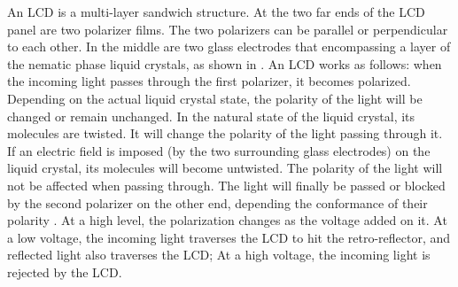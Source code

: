 An LCD is a multi-layer sandwich structure. At the two far ends of the LCD panel are two polarizer films. The two polarizers can be parallel or perpendicular to each other. In the middle are two glass electrodes that encompassing a layer of the nematic phase liquid crystals, as shown in . 
An LCD works as follows: when the incoming light passes through the first polarizer, it becomes polarized. Depending on the actual liquid crystal state, the polarity of the light will be changed or remain unchanged. 
In the natural state of the liquid crystal, its molecules are twisted. It will change the polarity of the light passing through it. If an electric field is imposed (by the two surrounding glass electrodes) on the liquid crystal, its molecules will become untwisted. The polarity of the light will not be affected when passing through. The light will finally be passed or blocked by the second polarizer on the other end, depending the conformance of their polarity \cite{eavesdrop2}. %
At a high level, the polarization changes as the voltage added on it. At a low voltage, the incoming light traverses the LCD to hit the retro-reflector, and reflected light also traverses the LCD; At a high voltage, the incoming light is rejected by the LCD. 




